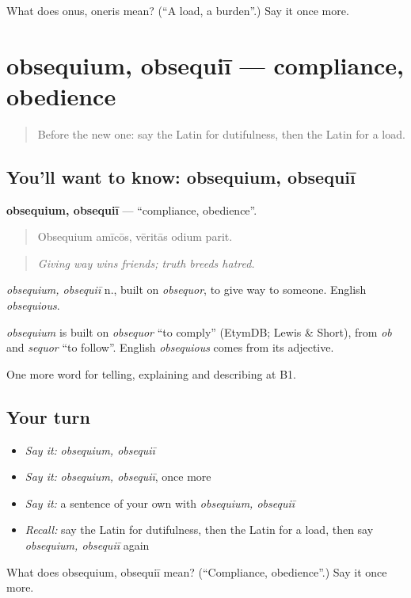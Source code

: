 \begin{tcolorbox}[breakable,colback=teal!4,colframe=teal!35!black,title={Before you move on}]
What does onus, oneris mean? (\textquotedblleft{}A load, a burden\textquotedblright{}.) Say it once more.
\end{tcolorbox}
\section[obsequium, obsequiī]{obsequium, obsequiī — compliance, obedience}

\label{lesson:LA-C389-obsequium}



\begin{quote}
Before the new one: say the Latin for dutifulness, then the Latin for a load.
\end{quote}

\subsection*{You'll want to know: obsequium, obsequiī}
\textbf{obsequium, obsequiī} — \textquotedblleft{}compliance, obedience\textquotedblright{}.

\begin{quote}
Obsequium amīcōs, vēritās odium parit.
\end{quote}

\begin{quote}
\emph{Giving way wins friends; truth breeds hatred.}
\end{quote}

\emph{obsequium, obsequiī} n., built on \emph{obsequor}, to give way to someone. English \emph{obsequious}.

\begin{cousinweb}
\emph{obsequium} is built on \emph{obsequor} \textquotedblleft{}to comply\textquotedblright{} (EtymDB; Lewis \& Short), from \emph{ob} and \emph{sequor} \textquotedblleft{}to follow\textquotedblright{}. English \emph{obsequious} comes from its adjective.
\end{cousinweb}

\begin{grammarlens}[title={What you've built}]
One more word for telling, explaining and describing at B1.
\end{grammarlens}

\subsection*{Your turn}
\begin{itemize}
\raggedright
  \item \emph{Say it:} \emph{obsequium, obsequiī}
  \item \emph{Say it:} \emph{obsequium, obsequiī}, once more
  \item \emph{Say it:} a sentence of your own with \emph{obsequium, obsequiī}
  \item \emph{Recall:} say the Latin for dutifulness, then the Latin for a load, then say \emph{obsequium, obsequiī} again
\end{itemize}

\begin{tcolorbox}[breakable,colback=teal!4,colframe=teal!35!black,title={Before you move on}]
What does obsequium, obsequiī mean? (\textquotedblleft{}Compliance, obedience\textquotedblright{}.) Say it once more.
\end{tcolorbox}
